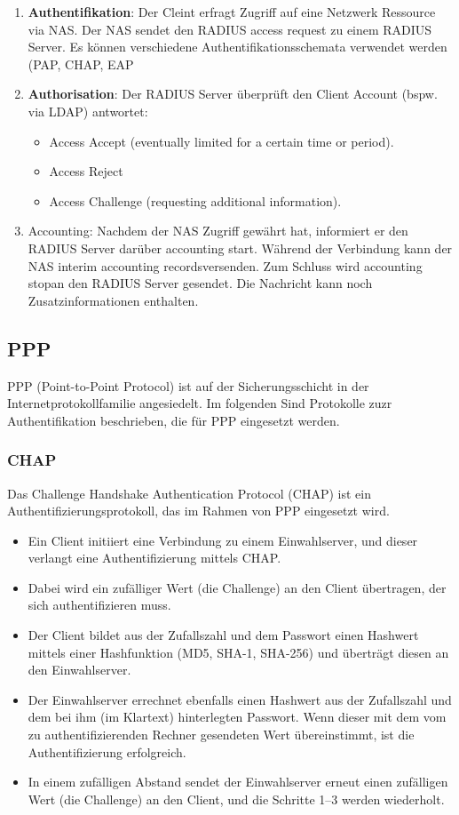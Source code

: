 \documentclass{article} %
\begin{document}
	\begin{enumerate}
	\item \textbf{Authentifikation}: Der Cleint erfragt Zugriff auf eine Netzwerk Ressource via NAS. Der NAS sendet den RADIUS access request zu einem RADIUS Server. Es können verschiedene Authentifikationsschemata verwendet werden (PAP, CHAP, EAP
	\item \textbf{Authorisation}: Der RADIUS Server überprüft den Client Account (bspw. via LDAP) antwortet:
		\begin{itemize}
		\item Access Accept (eventually limited for a certain time or period). 
		\item Access Reject 
		\item Access Challenge (requesting additional information). 
		\end{itemize}
	\item Accounting: Nachdem der NAS Zugriff gewährt hat, informiert er den RADIUS Server darüber \glqq accounting start\grqq. Während der Verbindung kann der NAS \glqq interim accounting records\grqq versenden. Zum Schluss wird \glqq accounting stop\grqq an den RADIUS Server gesendet. Die Nachricht kann noch Zusatzinformationen enthalten.
	\end{enumerate}
\subsection{PPP}
PPP (Point-to-Point Protocol) ist auf der Sicherungsschicht in der Internetprotokollfamilie angesiedelt. Im folgenden Sind Protokolle zuzr Authentifikation beschrieben, die für PPP eingesetzt werden.
\subsubsection{CHAP}
Das Challenge Handshake Authentication Protocol (CHAP) ist ein Authentifizierungsprotokoll, das im Rahmen von PPP eingesetzt wird. 
	\begin{itemize}
	\item Ein Client initiiert eine Verbindung zu einem Einwahlserver, und dieser verlangt eine Authentifizierung mittels CHAP. 
	\item Dabei wird ein zufälliger Wert (die Challenge) an den Client übertragen, der sich authentifizieren muss.
	\item Der Client bildet aus der Zufallszahl und dem Passwort einen Hashwert mittels einer Hashfunktion (MD5, SHA-1, SHA-256) und überträgt diesen an den Einwahlserver.
	\item Der Einwahlserver errechnet ebenfalls einen Hashwert aus der Zufallszahl und dem bei ihm (im Klartext) hinterlegten Passwort. Wenn dieser mit dem vom zu authentifizierenden Rechner gesendeten Wert übereinstimmt, ist die Authentifizierung erfolgreich.
	\item In einem zufälligen Abstand sendet der Einwahlserver erneut einen zufälligen Wert (die Challenge) an den Client, und die Schritte 1–3 werden wiederholt.
	\end{itemize}
\end{document}

